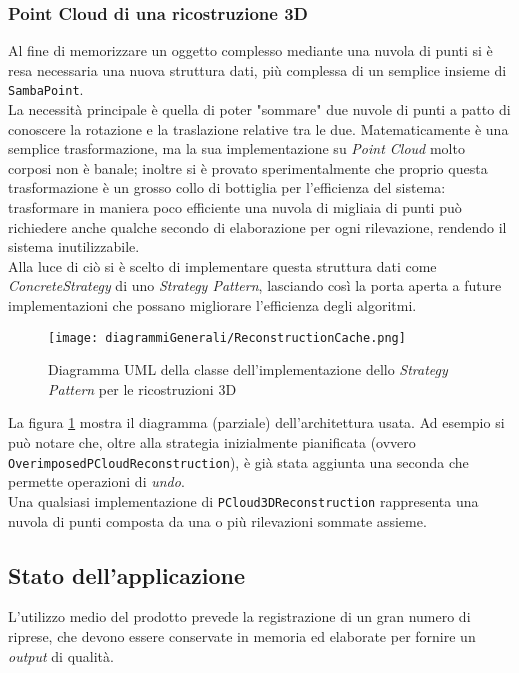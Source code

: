 \subsubsection{Point Cloud di una ricostruzione 3D}
Al fine di memorizzare un oggetto complesso mediante una nuvola di punti si è resa necessaria una nuova struttura dati, più complessa di un semplice insieme di \texttt{SambaPoint}.\\
La necessità principale è quella di poter "sommare" due nuvole di punti a patto di conoscere la rotazione e la traslazione relative tra le due. Matematicamente è una semplice trasformazione, ma la sua implementazione su \emph{Point Cloud} molto corposi non è banale; inoltre si è provato sperimentalmente che proprio questa trasformazione è un grosso collo di bottiglia per l'efficienza del sistema: trasformare in maniera poco efficiente una nuvola di migliaia di punti può richiedere anche qualche secondo di elaborazione per ogni rilevazione, rendendo il sistema inutilizzabile.\\
Alla luce di ciò si è scelto di implementare questa struttura dati come \emph{ConcreteStrategy} di uno \emph{Strategy Pattern}, lasciando così la porta aperta a future implementazioni che possano migliorare l'efficienza degli algoritmi.
\begin{figure}[H] 
    \centering 
    \texttt{[image: diagrammiGenerali/ReconstructionCache.png]} 
    \caption{Diagramma UML della classe dell'implementazione dello \emph{Strategy Pattern} per le ricostruzioni 3D}
    \label{fig:reconstruction-strategy}
\end{figure}
La figura \ref{fig:reconstruction-strategy} mostra il diagramma (parziale) dell'architettura usata. Ad esempio si può notare che, oltre alla strategia inizialmente pianificata (ovvero \\\texttt{OverimposedPCloudReconstruction}), è già stata aggiunta una seconda che permette operazioni di \emph{undo}.\\
Una qualsiasi implementazione di \texttt{PCloud3DReconstruction} rappresenta una nuvola di punti composta da una o più rilevazioni sommate assieme.

\subsection{Stato dell'applicazione}
L'utilizzo medio del prodotto prevede la registrazione di un gran numero di riprese, che devono essere conservate in memoria ed elaborate per fornire un \emph{output} di qualità.

